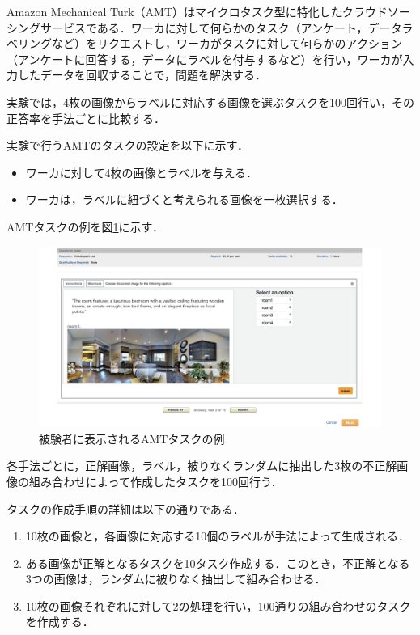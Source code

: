 \documentclass[a4paper,11pt]{jreport}
\begin{document}
Amazon Mechanical Turk（AMT）はマイクロタスク型に特化したクラウドソーシングサービスである．ワーカに対して何らかのタスク（アンケート，データラベリングなど）をリクエストし，ワーカがタスクに対して何らかのアクション（アンケートに回答する，データにラベルを付与するなど）を行い，ワーカが入力したデータを回収することで，問題を解決する．

実験では，4枚の画像からラベルに対応する画像を選ぶタスクを100回行い，その正答率を手法ごとに比較する．

実験で行うAMTのタスクの設定を以下に示す．

\begin{itemize}
  \item ワーカに対して4枚の画像とラベルを与える．
  \item ワーカは，ラベルに紐づくと考えられる画像を一枚選択する．
\end{itemize}

AMTタスクの例を図\ref{fig:amt_example}に示す．

\begin{figure}[H]
  \centering
  \includegraphics[width=\linewidth]{figures/amt.png}
  \caption{被験者に表示されるAMTタスクの例}
  \label{fig:amt_example}
\end{figure}

各手法ごとに，正解画像，ラベル，被りなくランダムに抽出した3枚の不正解画像の組み合わせによって作成したタスクを100回行う．

タスクの作成手順の詳細は以下の通りである．
\begin{enumerate}
  \item 10枚の画像と，各画像に対応する10個のラベルが手法によって生成される．
  \item ある画像が正解となるタスクを10タスク作成する．このとき，不正解となる3つの画像は，ランダムに被りなく抽出して組み合わせる．
  \item 10枚の画像それぞれに対して2の処理を行い，100通りの組み合わせのタスクを作成する．
\end{enumerate}
\end{document}
